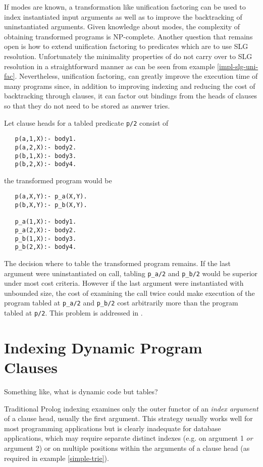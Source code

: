If modes are known, a transformation like unification factoring can be
used to index instantiated input arguments as well as to improve the
backtracking of uninstantiated arguments.  Given knowledge about
modes, the complexity of obtaining transformed programs is
NP-complete.  Another question that remains open is how to extend
unification factoring to predicates which are to use SLG resolution.
Unfortunately the minimality properties of \cite{DRRSSSW94} do not
carry over to SLG resolution in a straightforward manner as can be
seen from example
\ref{impl-slg-uni-fac}.  Nevertheless, unification factoring, can
greatly improve the execution time of many programs since, in addition
to improving indexing and reducing the cost of backtracking through
clauses, it can factor out bindings from the heads of clauses so that
they do not need to be stored as answer tries.

\begin{example} \rm \label{impl-slg-uni-fac}
Let clause heads for a tabled predicate {\tt p/2} consist of 
\begin{verbatim}
   p(a,1,X):- body1.
   p(a,2,X):- body2.
   p(b,1,X):- body3.
   p(b,2,X):- body4.
\end{verbatim}
the transformed program would be
\begin{verbatim}
   p(a,X,Y):- p_a(X,Y).
   p(b,X,Y):- p_b(X,Y).

   p_a(1,X):- body1.
   p_a(2,X):- body2.
   p_b(1,X):- body3.
   p_b(2,X):- body4.
\end{verbatim}
The decision where to table the transformed program remains.  If the
last argument were uninstantiated on call, tabling {\tt p\_a/2} and
{\tt p\_b/2} would be superior under most cost criteria.  However if
the last argument were instantiated with unbounded size, the cost of
examining the call twice could make execution of the program tabled at
{\tt p\_a/2} and {\tt p\_b/2} cost arbitrarily more than the program
tabled at {\tt p/2}.  This problem is addressed in \cite{DRRS94}.
\end{example}

\section{Indexing Dynamic Program Clauses}

Something like, what is dynamic code but tables?

Traditional Prolog indexing examines only the outer functor of an {\em
index argument} of a clause head, usually the first argument.  This
strategy usually works well for most programming applications but is
clearly inadequate for database applications, which may require
separate distinct indexes (e.g. on argument 1 {\em or} argument 2) or
on multiple positions within the arguments of a clause head (as
required in example \ref{simple-trie}).

